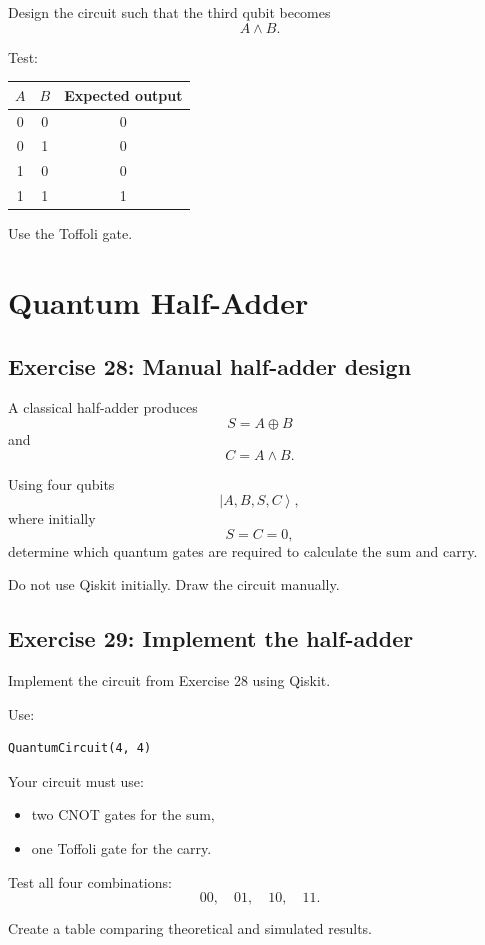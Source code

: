 \documentclass[12pt,a4paper]{article}
\newcommand{\ket}[1]{\left|#1\right\rangle}
\begin{document}
Design the circuit such that the third qubit becomes
\[
A\land B.
\]

Test:
\begin{center}
\begin{tabular}{ccc}
\toprule
$A$ & $B$ & Expected output \\
\midrule
0 & 0 & 0 \\
0 & 1 & 0 \\
1 & 0 & 0 \\
1 & 1 & 1 \\
\bottomrule
\end{tabular}
\end{center}

Use the Toffoli gate.

\section{Quantum Half-Adder}

\subsection*{Exercise 28: Manual half-adder design}
A classical half-adder produces
\[
S=A\oplus B
\]
and
\[
C=A\land B.
\]

Using four qubits
\[
\ket{A,B,S,C},
\]
where initially
\[
S=C=0,
\]
determine which quantum gates are required to calculate the sum and carry.

Do not use Qiskit initially. Draw the circuit manually.

\subsection*{Exercise 29: Implement the half-adder}
Implement the circuit from Exercise 28 using Qiskit.

Use:
\begin{lstlisting}
QuantumCircuit(4, 4)
\end{lstlisting}

Your circuit must use:
\begin{itemize}
    \item two CNOT gates for the sum,
    \item one Toffoli gate for the carry.
\end{itemize}

Test all four combinations:
\[
00,\quad 01,\quad 10,\quad 11.
\]

Create a table comparing theoretical and simulated results.
\end{document}

